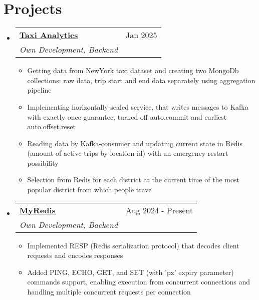 \documentclass[letterpaper,10.8pt]{article}
\makeatletter
\newcommand{\resumeSubheadingProjects}[5]{
  \vspace{-1pt}\item
    \begin{tabular*}{0.97\textwidth}{l@{\extracolsep{\fill}}r}
      \textbf{#1} \mid {#2} & #3 \\
      \textit{\small#4} & \textit{\small #5} \\
    \end{tabular*}\vspace{-5pt}
}
\newcommand{\resumeSubHeadingListStart}{\begin{itemize}[leftmargin=*]}
\newcommand{\resumeSubHeadingListEnd}{\end{itemize}}
\makeatother
\begin{document}
\section{Projects}
  \resumeSubHeadingListStart
    \resumeSubheadingProjects
    {\href{https://github.com/DenChika/NewYork-taxi-analytics}
    {\underline{Taxi Analytics}}}{Golang, cobra, MongoDB, Kafka, confluent-kafka-go, Redis, go-redis}{Jan 2025}
    {Own Development, Backend}{}
    \begin{itemize}
        \item {Getting data from NewYork taxi dataset and creating two MongoDb collections: raw data, trip start and end data separately using aggregation pipeline}
        \item {Implementing horizontally-scaled service, that writes messages to Kafka with exactly once guarantee, turned off auto.commit and earliest auto.offset.reset}
        \item {Reading data by Kafka-consumer and updating current state in Redis (amount of active trips by location id) with an emergency restart possibility}
        \item {Selection from Redis for each district at the current time of the most popular district from which people trave}
    \end{itemize}
    
    \resumeSubheadingProjects
    {\href{https://github.com/DenChika/MyRedis}
    {\underline{MyRedis}}}{Golang, Redis}{Aug 2024 - Present}
    {Own Development, Backend}{}
    \begin{itemize}
        \item {Implemented RESP (Redis serialization protocol) that decodes client requests and encodes responses}
        \item {Added PING, ECHO, GET, and SET (with 'px' expiry parameter) commands support, enabling execution from concurrent connections and handling multiple concurrent requests per connection}
    \end{itemize}
    
\resumeSubHeadingListEnd
\end{document}
